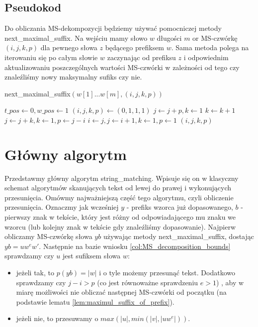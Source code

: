 \documentclass[a4paper,11pt]{article}
\theoremstyle{definition}
\begin{document}
\subsection{Pseudokod}

Do obliczania MS-dekompozycji będziemy używać pomocniczej metody next\_maximal\_suffix. Na wejściu mamy słowo $w$ długości $m$ or MS-czwórkę $(i,j,k,p)$ dla pewnego słowa $z$ będącego prefiksem $w$. Sama metoda polega na iterowaniu się po całym słowie $w$ zaczynając od prefiksu $z$ i odpowiednim aktualizowaniu poszczególnych wartości MS-czwórki w zależności od tego czy znaleźliśmy nowy maksymalny sufiks czy nie.

\begin{algorithm}[H]
\caption{next\_maximal\_suffix$(w[1]...w[m], (i, j, k, p))$}\label{alg:next_maximal_suffix}
\begin{algorithmic} 
\STATE $t\_pos \gets 0,  w\_pos \gets 1$
\STATE $(i,j,k,p) \gets (0,1,1,1)$
            \STATE $j \gets j + p, k \gets 1$
        \ELSE
            \STATE $k \gets k + 1$
        \ENDIF
        \STATE $j \gets j + k, k \gets 1, p \gets j - i$
    \ELSE
        \STATE $i \gets j, j \gets i + 1, k \gets 1, p \gets 1$
    \ENDIF
\ENDWHILE
\RETURN $(i, j, k, p)$

\end{algorithmic}
\end{algorithm}

\section{Główny algorytm}
Przedstawmy główny algorytm string\_matching. Wpisuje się on w klasyczny schemat algorytmów skanujących tekst od lewej do prawej i wykonujących przesunięcia. Omówmy najważniejszą część tego algorytmu, czyli obliczenie przesunięcia. Oznaczmy jak wcześniej $y$ - prefiks wzorca już dopasowanego, $b$ - pierwszy znak w tekście, który jest różny od odpowiadającego mu znaku we wzorcu (lub kolejny znak w tekście gdy znaleźliśmy dopasowanie). Najpierw obliczamy MS-czwórkę słowa $yb$ używając metody next\_maximal\_suffix, dostając $yb = uw^ew'$. Następnie na bazie wniosku \ref{col:MS_decomposition_bounds} sprawdzamy czy $u$ jest sufiksem słowa $w$:
\begin{itemize}
    \item jeżeli tak, to $p(yb) = |w|$ i o tyle możemy przesunąć tekst. Dodatkowo sprawdzamy czy $j - i > p$ (co jest równoważne sprawdzeniu $e > 1$) , aby w miarę możliwości nie obliczać następnej MS-czwórki od początku (na podstawie lematu \ref{lem:maximul_suffix_of_prefix}). 
    \item jeżeli nie, to przesuwamy o $max(|u|, min(|v|, |uw^e|))$.
\end{itemize}
\end{document}
